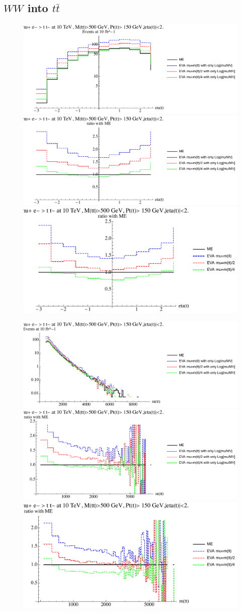 \documentclass[a4paper,11pt]{article}
\begin{document}
\clearpage
\subsection{$WW$ into $t \bar t$}

\begin{figure}[ht]
\includegraphics[width=0.46\linewidth]{Notebooks/PlotDistr/WW_tt/10TeVcuts/plotetat.pdf}
\includegraphics[width=0.46\linewidth]{Notebooks/PlotDistr/WW_tt/10TeVcuts/plotetatratio1.pdf}
\includegraphics[width=0.46\linewidth]{Notebooks/PlotDistr/WW_tt/10TeVcuts/plotetatratio2.pdf}
\end{figure}

\begin{figure}[ht]
\includegraphics[width=0.46\linewidth]{Notebooks/PlotDistr/WW_tt/10TeVcuts/plotmtt.pdf}
\includegraphics[width=0.46\linewidth]{Notebooks/PlotDistr/WW_tt/10TeVcuts/plotmttratio1.pdf}
\includegraphics[width=0.46\linewidth]{Notebooks/PlotDistr/WW_tt/10TeVcuts/plotmttratio2.pdf}
\end{figure}
\end{document}

